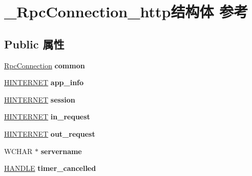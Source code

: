 \hypertarget{struct___rpc_connection__http}{}\section{\+\_\+\+Rpc\+Connection\+\_\+http结构体 参考}
\label{struct___rpc_connection__http}
\subsection*{Public 属性}
\begin{DoxyCompactItemize}
\item 
\mbox{\label{struct___rpc_connection__http_a6ebbe8e294060f239d6ad182bf9b3b0f}} 
\hyperlink{struct___rpc_connection}{Rpc\+Connection} {\bfseries common}
\item 
\mbox{\label{struct___rpc_connection__http_a0d72f92646f065195ba1f643272e4801}} 
\hyperlink{interfacevoid}{H\+I\+N\+T\+E\+R\+N\+ET} {\bfseries app\+\_\+info}
\item 
\mbox{\label{struct___rpc_connection__http_a4656ca202f9069ace856e332e801af93}} 
\hyperlink{interfacevoid}{H\+I\+N\+T\+E\+R\+N\+ET} {\bfseries session}
\item 
\mbox{\label{struct___rpc_connection__http_a417344094f2a019da994f79078e27f48}} 
\hyperlink{interfacevoid}{H\+I\+N\+T\+E\+R\+N\+ET} {\bfseries in\+\_\+request}
\item 
\mbox{\label{struct___rpc_connection__http_afa7c95d3037834a5dcf9f660f0a17482}} 
\hyperlink{interfacevoid}{H\+I\+N\+T\+E\+R\+N\+ET} {\bfseries out\+\_\+request}
\item 
\mbox{\label{struct___rpc_connection__http_a366a889f20febbfcd7a67a37046e980e}} 
W\+C\+H\+AR $\ast$ {\bfseries servername}
\item 
\mbox{\label{struct___rpc_connection__http_a10ec1054333a68e91a711a7e2b242888}} 
\hyperlink{interfacevoid}{H\+A\+N\+D\+LE} {\bfseries timer\+\_\+cancelled}
\item 
\mbox{\label{struct___rpc_connection__http_adbd532c7fad7503fa0f16204a04069f0}} 

\end{DoxyCompactItemize}
